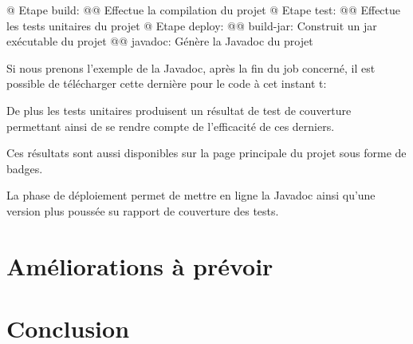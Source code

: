 \documentclass[final, noposter]{polytech/polytech}
\begin{document}
	\begin{easylist}[itemize]
		@ Etape build:
		@@ Effectue la compilation du projet
		@ Etape test:
		@@ Effectue les tests unitaires du projet
		@ Etape deploy:
		@@ build-jar: Construit un jar exécutable du projet
		@@ javadoc: Génère la Javadoc du projet
	\end{easylist}
	
	Si nous prenons l'exemple de la Javadoc, après la fin du job concerné, il est possible de télécharger cette dernière pour le code à cet instant t:
	
	De plus les tests unitaires produisent un résultat de test de couverture permettant ainsi de se rendre compte de l'efficacité de ces derniers. 
	
	Ces résultats sont aussi disponibles sur la page principale du projet sous forme de badges.
	
	La phase de déploiement permet de mettre en ligne la Javadoc ainsi qu'une version plus poussée su rapport de couverture des tests.

\chapter{Améliorations à prévoir}

\chapter{Conclusion}
\end{document}

